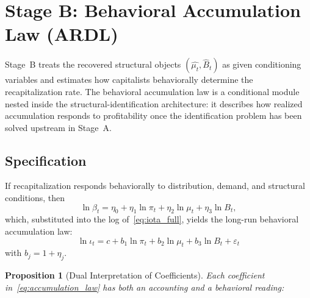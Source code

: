\documentclass[12pt,letterpaper]{article}
\newcommand{\mut}{\mu_t}           %
\newcommand{\pit}{\pi_t}           %
\newcommand{\iotat}{\iota_t}       %
\newcommand{\betat}{\beta_t}       %
\newcommand{\Bt}{B_t}              %
\newtheorem{proposition}{Proposition}[section]
\begin{document}
\section{Stage B: Behavioral Accumulation Law (ARDL)}
\label{sec:stageB}

Stage~B treats the recovered structural objects $(\widehat{\mut}, \hat{B}_t)$
as given conditioning variables and estimates how capitalists behaviorally
determine the recapitalization rate. The behavioral accumulation law is a
conditional module nested inside the structural-identification architecture: it
describes how realized accumulation responds to profitability once the
identification problem has been solved upstream in Stage~A.


\subsection{Specification}
\label{sec:stageB_spec}

If recapitalization responds behaviorally to distribution, demand, and
structural conditions, then
\begin{equation}
  \ln\betat = \eta_0 + \eta_1\ln\pit + \eta_2\ln\mut + \eta_3\ln\Bt,
  \label{eq:beta_behavioral}
\end{equation}
which, substituted into the log of~\eqref{eq:iota_full}, yields the
long-run behavioral accumulation law:
\begin{equation}
  \boxed{
  \ln\iotat = c + b_1\ln\pit + b_2\ln\mut + b_3\ln\Bt + \varepsilon_t
  }
  \label{eq:accumulation_law}
\end{equation}
with $b_j = 1 + \eta_j$.

\begin{proposition}[Dual Interpretation of Coefficients]
\label{prop:dual}
Each coefficient in~\eqref{eq:accumulation_law} has both an accounting
and a behavioral reading:
\end{proposition}
\end{document}
